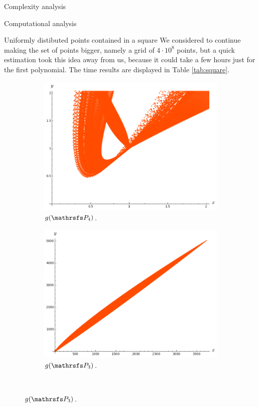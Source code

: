 \documentclass[11pt, a4paper, english, twoside, notitlepage, openright]{report}
\begin{document}
\begin{chapter}{Complexity analysis}
\begin{section}{Computational analysis}
\begin{subsection}{Uniformly distibuted points contained in a square}
We considered to continue making the set of points bigger, namely a grid of $4\cdot 10^8$ points, but a quick estimation took this idea away from us, because it could take a few hours just for the first polynomial. The time results are displayed in Table \ref{tab:square}.

\begin{figure}[ht!]
\hspace{0.1cm}
\begin{subfigure}{.49\linewidth}\centering
\includegraphics[width=1\textwidth]{plots/ch5_08_P4prime.png}
\vspace{-0.4cm}\caption{$g(\PP_4)$.\label{fig:gP4}}
\end{subfigure}
\begin{subfigure}{.49\linewidth}\centering
\includegraphics[width=1\textwidth]{plots/ch5_04_P3.png}
\vspace{-0.4cm}\caption{$g(\PP_3)$.\label{fig:gP3}}
\end{subfigure}\\[1ex]
\vspace{-0.2cm}


\end{figure}
\end{subsection}
\end{section}
\end{chapter}
\end{document}
